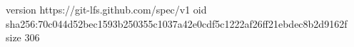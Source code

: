 version https://git-lfs.github.com/spec/v1
oid sha256:70c044d52bec1593b250355c1037a42e0cdf5c1222af26ff21ebdec8b2d9162f
size 306
